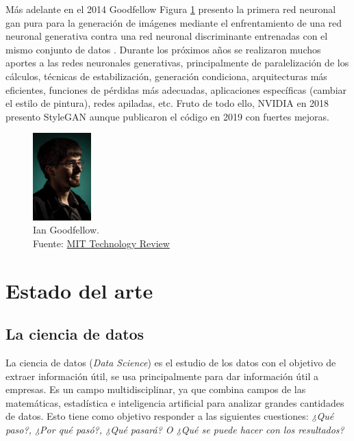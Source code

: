 Más adelante en el 2014 {Goodfellow} Figura \ref{fig:gan-ian-goodfellow} presento la primera red neuronal \acrshort{gan} pura para la generación de imágenes mediante el enfrentamiento de una red neuronal generativa contra una red neuronal discriminante entrenadas con el mismo conjunto de datos \cite{goodfellow2014generative}.
Durante los próximos años se realizaron muchos aportes a las redes neuronales generativas, principalmente de paralelización de los cálculos, técnicas de estabilización, generación condiciona, arquitecturas más eficientes, funciones de pérdidas más adecuadas, aplicaciones específicas (cambiar el estilo de pintura), redes apiladas, etc.
Fruto de todo ello, {NVIDIA} en 2018 presento \gls{StyleGAN} \cite{karras2019stylebased} aunque publicaron el código en 2019 con fuertes mejoras.

\begin{figure}[H]
    \centering
    \includegraphics[width=0.2\textwidth]{figures/gan-goodfellow.png}
    \caption{Ian Goodfellow.\\Fuente: \href{https://www.technologyreview.es/s/10016/el-senor-de-las-gan-el-hombre-que-dio-imaginacion-las-maquinas}{MIT Technology Review}}
    \label{fig:gan-ian-goodfellow}
\end{figure}


\section{Estado del arte}
\label{ch:2:section:state-of-the-art}

\subsection{La ciencia de datos}
La ciencia de datos (\textit{Data Science}) es el estudio de los datos con el objetivo de extraer información útil, se usa principalmente para dar información útil a empresas. Es un campo multidisciplinar, ya que combina campos de las matemáticas, estadística e inteligencia artificial para analizar grandes cantidades de datos. Esto tiene como objetivo responder a las siguientes cuestiones: \textit{¿Qué paso?, ¿Por qué pasó?, ¿Qué pasará? O ¿Qué se puede hacer con los resultados?} \cite{aws-data-science}

